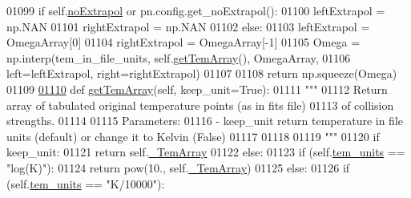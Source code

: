 \begin{DoxyCode}
{{01099             \textcolor{keywordflow}{if} self.\hyperlink{classpyneb_1_1core_1_1pynebcore_1_1___coll_data_ascii_aa4f6c8d0a2a8e4ac6503d67b4a51188d}{noExtrapol} \textcolor{keywordflow}{or} pn.config.get\_noExtrapol():
01100                 leftExtrapol = np.NAN
01101                 rightExtrapol = np.NAN
01102             \textcolor{keywordflow}{else}:
01103                 leftExtrapol = OmegaArray[0]
01104                 rightExtrapol = OmegaArray[-1]
01105             Omega = np.interp(tem\_in\_file\_units, self.\hyperlink{classpyneb_1_1core_1_1pynebcore_1_1___coll_data_ascii_aaf234dd4932c7f789eb8eaaf6a16cfc9}{getTemArray}(), OmegaArray,
01106                               left=leftExtrapol, right=rightExtrapol)
01107         
01108         \textcolor{keywordflow}{return} np.squeeze(Omega)
01109     
\hypertarget{pynebcore_8py_source_l01110}{}\hyperlink{classpyneb_1_1core_1_1pynebcore_1_1___coll_data_ascii_aaf234dd4932c7f789eb8eaaf6a16cfc9}{01110}     \textcolor{keyword}{def }\hyperlink{classpyneb_1_1core_1_1pynebcore_1_1___coll_data_ascii_aaf234dd4932c7f789eb8eaaf6a16cfc9}{getTemArray}(self, keep\_unit=True):
01111         \textcolor{stringliteral}{"""}
01112 \textcolor{stringliteral}{        Return array of tabulated original temperature points (as in fits file) }
01113 \textcolor{stringliteral}{            of collision strengths.}
01114 \textcolor{stringliteral}{        }
01115 \textcolor{stringliteral}{        Parameters:}
01116 \textcolor{stringliteral}{            - keep\_unit   return temperature in file units (default) or change it to Kelvin (False)}
01117 \textcolor{stringliteral}{}
01118 \textcolor{stringliteral}{}
01119 \textcolor{stringliteral}{        """}
01120         \textcolor{keywordflow}{if} keep\_unit:
01121             \textcolor{keywordflow}{return} self.\hyperlink{classpyneb_1_1core_1_1pynebcore_1_1___coll_data_ascii_adb47c4cf2b9f3b82a281d0277e136693}{\_TemArray}
01122         \textcolor{keywordflow}{else}:            
01123             \textcolor{keywordflow}{if} (self.\hyperlink{classpyneb_1_1core_1_1pynebcore_1_1___coll_data_ascii_ad026d62c0262a257b38f70a1d7b88c9b}{tem\_units} == \textcolor{stringliteral}{"log(K)"}):
01124                 \textcolor{keywordflow}{return} pow(10., self.\hyperlink{classpyneb_1_1core_1_1pynebcore_1_1___coll_data_ascii_adb47c4cf2b9f3b82a281d0277e136693}{\_TemArray})
01125             \textcolor{keywordflow}{else}:
01126                 \textcolor{keywordflow}{if} (self.\hyperlink{classpyneb_1_1core_1_1pynebcore_1_1___coll_data_ascii_ad026d62c0262a257b38f70a1d7b88c9b}{tem\_units} == \textcolor{stringliteral}{"K/10000"}):
}}
\end{DoxyCode}
